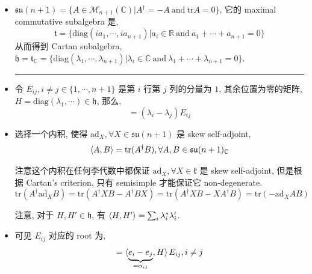 \begin{itemize}
	\item $\mathfrak{su}(n + 1) = \{A \in \mathcal{M}_{n + 1}(\mathbb{C}) | A^\dag = - A \ \text{and} \ \mathrm{tr} A = 0\}$, 它的 maximal commutative subalgebra 是,
	\begin{equation}
		\mathfrak{t} = \{\mathrm{diag}(i a_1, \cdots, i a_{n + 1}) | a_i \in \mathbb{R} \ \text{and} \ a_1 + \cdots + a_{n + 1} = 0\}
	\end{equation}
	从而得到 Cartan subalgebra, $\mathfrak{h} = \mathfrak{t}_\mathbb{C} = \{\mathrm{diag}(\lambda_1, \cdots, \lambda_{n + 1}) | \lambda_i \in \mathbb{C} \ \text{and} \ \lambda_1 + \cdots + \lambda_{n + 1} = 0\}$.
	
	\noindent\rule[0.5ex]{\linewidth}{0.5pt} %
	
	\item 令 $E_{i j}, i \neq j \in \{1, \cdots, n + 1\}$ 是第 $i$ 行第 $j$ 列的分量为 $1$, 其余位置为零的矩阵, $H = \mathrm{diag}(\lambda_1, \cdots) \in \mathfrak{h}$, 那么,
	\begin{equation}
		[H, E_{i j}] = (\lambda_i - \lambda_j) E_{i j}
	\end{equation}
	
	\item 选择一个内积, 使得 $\mathrm{ad}_X, \forall X \in \mathfrak{su}(n + 1)$ 是 skew self-adjoint,
	\begin{equation}
		\braket{A, B} = \mathrm{tr}(A^\dag B), \forall A, B \in \mathfrak{su}(n + 1)_\mathbb{C}
	\end{equation}
	
	\begin{tcolorbox}[title=proof:]
		注意这个内积在任何李代数中都保证 $\mathrm{ad}_X, \forall X \in \mathfrak{k}$ 是 skew self-adjoint, 但是根据 Cartan's criterion, 只有 semisimple 才能保证它 non-degenerate.
		\begin{equation}
			\mathrm{tr}(A^\dag \mathrm{ad}_X B) = \mathrm{tr}(A^\dag X B - A^\dag B X) = \mathrm{tr}(A^\dag X B - X A^\dag B) = \mathrm{tr}(- \mathrm{ad}_X A B)
		\end{equation}
	\end{tcolorbox}
	
	注意, 对于 $H, H' \in \mathfrak{h}$, 有 $\braket{H, H'} = \sum_i \lambda_i^* \lambda'_i$.
	
	\item 可见 $E_{i j}$ 对应的 root 为,
	\begin{equation}
		[H, E_{i j}] = \braket{\underbrace{e_i - e_j}_{= \alpha_{i j}}, H} E_{i j}, i \neq j
	\end{equation}
	

\end{itemize}

